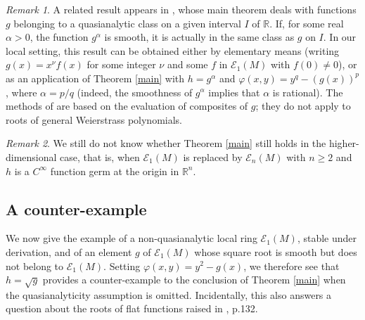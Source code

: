 \documentclass[a4paper]{amsart}
\theoremstyle{plain}
\theoremstyle{remark}
\newtheorem{rem}{Remark}
\begin{document}
\begin{rem}
A related result appears in \cite{Neelon}, whose main theorem deals with functions $ g $ belonging to a quasianalytic class on a given interval $ I $ of $ \mathbb{R} $. If, for some real $ \alpha>0 $, the function $ g^\alpha $ is smooth, it is actually in the same class as $ g $ on $ I $. In our local setting, this result can be obtained either by elementary means (writing $ g(x)=x^\nu f(x) $ for some integer $\nu $ and some $ f $ in $\mathcal{E}_1(M) $ with $ f(0)\neq 0$), or as an application of Theorem \ref{main} with $ h=g^\alpha $ and $ \varphi(x,y)=y^q-(g(x))^p $, where $ \alpha=p/q $ (indeed, the smoothness of $ g^\alpha $ implies that $ \alpha $ is rational). The methods of \cite{Neelon} are based on the evaluation of composites of $ g $; they do not apply to roots of general Weierstrass polynomials.  
\end{rem}

\begin{rem}
We still do not know whether Theorem \ref{main} still holds in the higher-dimensional case, that is, when $ \mathcal{E}_1(M) $ is replaced by $ \mathcal{E}_n(M) $ with $n\geq 2 $ and $ h $ is a $ C^\infty $ function germ at the origin in $ \mathbb{R}^n $.
\end{rem}



\subsection{A counter-example}\label{contrex}

We now give the example of a non-quasianalytic local ring $ \mathcal{E}_1(M) $, stable under derivation, and of an element $ g $ of $ \mathcal{E}_1(M) $ whose square root is smooth but does not belong to $ \mathcal{E}_1(M) $. Setting $ \varphi(x,y)=y^2-g(x) $, we therefore see that $ h=\sqrt{g} $ provides a counter-example to the conclusion of Theorem \ref{main} when the quasianalyticity assumption is omitted. Incidentally, this  also answers a question about the roots of flat functions raised in \cite{Neelon}, p.132. 
\end{document}
